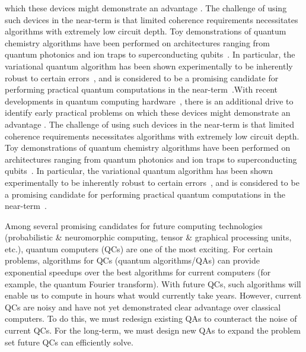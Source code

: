 \documentclass[10pt]{article}
\begin{document}
which these devices might demonstrate an advantage
\cite{Mohseni2017,Boixo2016}. The challenge of using such devices in
the near-term is that limited coherence requirements necessitates
algorithms with extremely low circuit depth. Toy demonstrations of
quantum chemistry algorithms have been performed on architectures
ranging from quantum photonics and ion traps to superconducting
qubits~\cite{Lanyon2010,Li2011,Wang2014,Peruzzo2013,Shen2015,OMalley2016,Kandala2017}. In
particular, the variational quantum algorithm
\cite{Peruzzo2013,McClean2015} has been shown experimentally to be
inherently robust to certain errors~\cite{OMalley2016}, and is
considered to be a promising candidate for performing practical
quantum computations in the near-term~\cite{Wecker2015a,Mueck2015}.With recent developments in quantum computing
hardware~\cite{Corcoles2015,Riste2015,Kelly2015,Barends2016,Roushan2017},
there is an additional drive to identify early practical problems on
which these devices might demonstrate an advantage
\cite{Mohseni2017,Boixo2016}. The challenge of using such devices in
the near-term is that limited coherence requirements necessitates
algorithms with extremely low circuit depth. Toy demonstrations of
quantum chemistry algorithms have been performed on architectures
ranging from quantum photonics and ion traps to superconducting
qubits~\cite{Lanyon2010,Li2011,Wang2014,Peruzzo2013,Shen2015,OMalley2016,Kandala2017}. In
particular, the variational quantum algorithm
\cite{Peruzzo2013,McClean2015} has been shown experimentally to be
inherently robust to certain errors~\cite{OMalley2016}, and is
considered to be a promising candidate for performing practical
quantum computations in the near-term~\cite{Wecker2015a,Mueck2015}.

Among several promising candidates for future computing technologies (probabilistic \& neuromorphic computing, tensor \& graphical processing units, etc.), quantum computers (QCs) are one of the most exciting. For certain problems, algorithms for QCs (quantum algorithms/QAs) can provide exponential speedups over the best algorithms for current computers (for example, the quantum Fourier transform). With future QCs, such algorithms will enable us to compute in hours what would currently take years. However, current QCs are noisy and have not yet demonstrated clear advantage over classical computers. To do this, we must redesign existing QAs to counteract the noise of current QCs. For the long-term, we must design new QAs to expand the problem set future QCs can efficiently solve.
\end{document}
